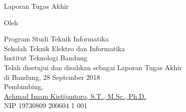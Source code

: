 \clearpage
\pagestyle{plain}

\begin{center}
\smallskip

    \Large \bfseries \MakeUppercase{\thetitle}
    \vfill

    \Large Laporan Tugas Akhir
    \vfill

    \large Oleh

    \Large \theauthor

    \large Program Studi Teknik Informatika \\
    \normalsize \normalfont
    Sekolah Teknik Elektro dan Informatika \\
    Institut Teknologi Bandung \\

    \vfill
    \normalsize \normalfont
    Telah disetujui dan disahkan sebagai Laporan Tugas Akhir \\
    di Bandung, 28 September 2018 \\

    \vspace{0.6 cm}
    Pembimbing, \\

    \vspace{2 cm}
    \underline{Achmad Imam Kistijantoro, S.T., M.Sc., Ph.D.} \\
    NIP 19730809 200604 1 001 \\

\end{center}
\clearpage
